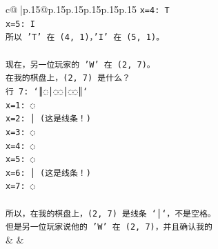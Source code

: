 \documentclass{article}
\begin{document}
{\begin{supertabular}{c@{$\;$}|p{.15\linewidth}@{}p{.15\linewidth}p{.15\linewidth}p{.15\linewidth}p{.15\linewidth}p{.15\linewidth}}
{{{\texttt{x=4: T} \\
\texttt{x=5: I} \\
\texttt{所以 'T' 在 (4, 1)，'I' 在 (5, 1)。} \\
\\ 
\texttt{现在，另一位玩家的 'W' 在 (2, 7)。} \\
\texttt{在我的棋盘上，(2, 7) 是什么？} \\
\texttt{行 7: `║◌│◌◌│◌◌║`} \\
\texttt{x=1: ◌} \\
\texttt{x=2: │ (这是线条！)} \\
\texttt{x=3: ◌} \\
\texttt{x=4: ◌} \\
\texttt{x=5: ◌} \\
\texttt{x=6: │ (这是线条！)} \\
\texttt{x=7: ◌} \\
\\ 
\texttt{所以，在我的棋盘上，(2, 7) 是线条 `│`，不是空格。} \\
\texttt{但是另一位玩家说他的 'W' 在 (2, 7)，并且确认我的} \\
            }
        }
    }
    & & \\ \\


\end{supertabular}}
\end{document}
